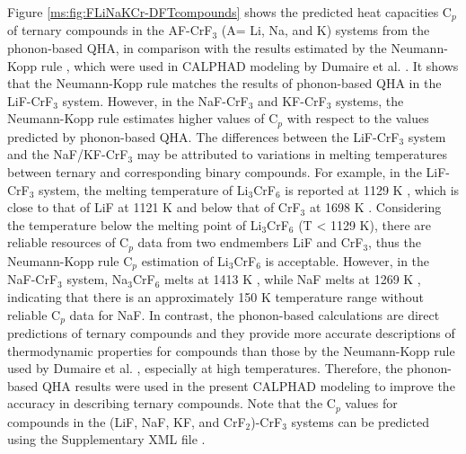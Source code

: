 Figure \ref{ms:fig:FLiNaKCr-DFTcompounds} shows the predicted heat capacities C$_p$ of ternary compounds in the AF-CrF$_3$ (A= Li, Na, and K) systems from the phonon-based QHA, in comparison with the results estimated by the Neumann-Kopp rule \cite{leitner2010application}, which were used in CALPHAD modeling by Dumaire et al. \cite{dumaire2021thermodynamic}. It shows that the Neumann-Kopp rule matches the results of phonon-based QHA in the LiF-CrF$_3$ system. However, in the NaF-CrF$_3$ and KF-CrF$_3$ systems, the Neumann-Kopp rule estimates higher values of C$_p$ with respect to the values predicted by phonon-based QHA. The differences between the LiF-CrF$_3$ system and the NaF/KF-CrF$_3$ may be attributed to variations in melting temperatures between ternary and corresponding binary compounds. For example, in the LiF-CrF$_3$ system, the melting temperature of Li$_3$CrF$_6$ is reported at 1129 K \cite{DeKozak1969}, which is close to that of LiF at 1121 K and below that of CrF$_3$ at 1698 K \cite{sgteurl}. Considering the temperature below the melting point of Li$_3$CrF$_6$ (T < 1129 K), there are reliable resources of C$_p$ data from two endmembers LiF and CrF$_3$, thus the Neumann-Kopp rule C$_p$ estimation of Li$_3$CrF$_6$ is acceptable. However, in the NaF-CrF$_3$ system, Na$_3$CrF$_6$ melts at 1413 K \cite{DeKozak1969}, while NaF melts at 1269 K \cite{sgteurl}, indicating that there is an approximately 150 K temperature range without reliable C$_p$ data for NaF. In contrast, the phonon-based calculations are direct predictions of ternary compounds and they provide more accurate descriptions of thermodynamic properties for compounds than those by the Neumann-Kopp rule used by Dumaire et al. \cite{dumaire2021thermodynamic}, especially at high temperatures. Therefore, the phonon-based QHA results were used in the present CALPHAD modeling to improve the accuracy in describing ternary compounds. Note that the C$_p$ values for compounds in the (LiF, NaF, KF, and CrF$_2$)-CrF$_3$ systems can be predicted using the Supplementary XML file \cite{gong2024revisiting}.

